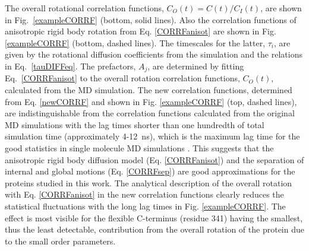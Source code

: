 \documentclass[journal=jpcbfk,manuscript=article]{achemso}
\begin{document}
The overall rotational correlation functions, $C_O(t)=C(t)/C_I(t)$,
are shown in Fig.~\ref{exampleCORRF} (bottom, solid lines).
Also the correlation functions of anisotropic rigid body rotation
from Eq. \ref{CORRFanisot} are shown in Fig. \ref{exampleCORRF} (bottom, dashed lines).
The timescales for the latter, $\tau_i$, are given by the rotational
diffusion coefficients from the simulation and the relations
in Eq.~\ref{tauDIFFeq}. The prefactors, $A_j$, are determined by fitting
Eq.~\ref{CORRFanisot} to the overall rotation correlation functions, $C_O(t)$, calculated from the MD simulation.
The new correlation functions, determined from Eq. \ref{newCORRF} and
shown in Fig. \ref{exampleCORRF} (top, dashed lines),
are indistinguishable from the correlation functions calculated from
the original MD simulations with the lag times shorter than one
hundredth of total simulation time (approximately 4-12~ns),
which is the maximum lag time for the good statistics in single molecule MD simulations \cite{lu06}.
This suggests that the anisotropic rigid body diffusion model (Eq. \ref{CORRFanisot}) and
the separation of internal and global motions (Eq. \ref{CORRFsep}) are
good approximations for the proteins studied in this work.
The analytical description of the overall rotation with Eq. \ref{CORRFanisot}
in the new correlation functions
clearly reduces the statistical fluctuations with the long lag times in Fig. \ref{exampleCORRF}.
The effect is most visible for the flexible C-terminus (residue 341) having
the smallest, thus the least detectable, contribution from the
overall rotation of the protein due to the small order parameters.
\end{document}
